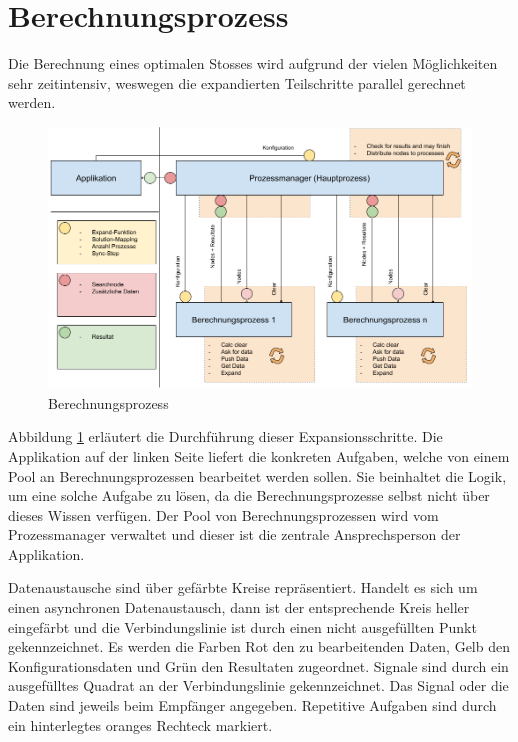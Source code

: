 \section{Berechnungsprozess}
Die Berechnung eines optimalen Stosses wird aufgrund der vielen Möglichkeiten sehr zeitintensiv, weswegen
die expandierten Teilschritte parallel gerechnet werden.

\begin{figure}[h!]
    \begin{center}
        \includegraphics[width=0.8\linewidth]{../common/03_billiard_ai/resources/14_berechnungsprozess.png}
    \end{center}
    \caption{Berechnungsprozess}
    \label{fig:berechnungsprozess}
\end{figure}

Abbildung \ref{fig:berechnungsprozess} erläutert die Durchführung dieser Expansionsschritte.
Die Applikation auf der linken Seite liefert die konkreten Aufgaben, welche von einem Pool an Berechnungsprozessen
bearbeitet werden sollen. Sie beinhaltet die Logik, um eine solche Aufgabe zu lösen, da die Berechnungsprozesse
selbst nicht über dieses Wissen verfügen.
Der Pool von Berechnungsprozessen wird vom Prozessmanager verwaltet und dieser ist die zentrale Ansprechsperson der Applikation.

Datenaustausche sind über gefärbte Kreise repräsentiert. Handelt es sich um einen asynchronen
Datenaustausch, dann ist der entsprechende Kreis heller eingefärbt und die Verbindungslinie ist durch einen nicht
ausgefüllten Punkt gekennzeichnet. Es werden die Farben Rot den zu bearbeitenden Daten,
Gelb den Konfigurationsdaten und Grün den Resultaten zugeordnet. Signale sind durch ein ausgefülltes Quadrat an der
Verbindungslinie gekennzeichnet. Das Signal oder die Daten sind jeweils beim Empfänger angegeben. Repetitive Aufgaben
sind durch ein hinterlegtes oranges Rechteck markiert.

